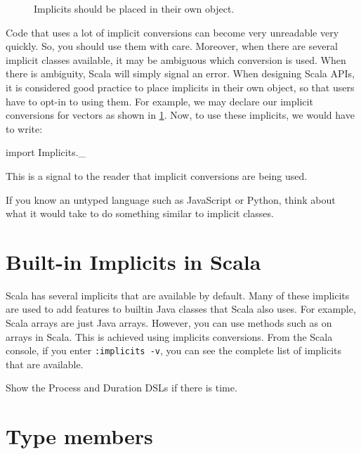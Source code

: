 \documentclass{book}
\begin{document}
\begin{figure}
\caption{Implicits should be placed in their own object.}
\label{vectorimplicits}
\end{figure}


Code that uses a lot of implicit conversions can become
very unreadable very quickly. So, you should use them with care.
Moreover, when there are several implicit classes available,
it may be ambiguous which conversion is used. When there is
ambiguity, Scala will simply signal an error.
When designing Scala APIs, it is considered good practice to place implicits in
their own object, so that users have to opt-in to using them. For example,
we may declare our implicit conversions for vectors as shown in
\cref{vectorimplicits}. Now, to use these implicits, we would have to
write:
\begin{scalacode}
import Implicits._
\end{scalacode}
This is a signal to the reader that implicit conversions are being used.

\begin{think}
If you know an untyped language such as JavaScript or Python, think about what
it would take to do something similar to implicit classes.
\end{think}

\section{Built-in Implicits in Scala}

Scala has several implicits that are available by default. Many of these
implicits are used to add features to builtin Java classes that Scala
also uses. For example, Scala arrays are just Java arrays. However,
you can use methods such as  on arrays in Scala.
This is achieved using implicits conversions.  From the Scala console,
if you enter \lstinline[language=console]{:implicits -v}, you can see the complete
list of implicits that are available.

\begin{instructor}
Show the Process and Duration DSLs if there is time.
\end{instructor}

\newlecture



\newlecture

\section{Type members}
\end{document}

